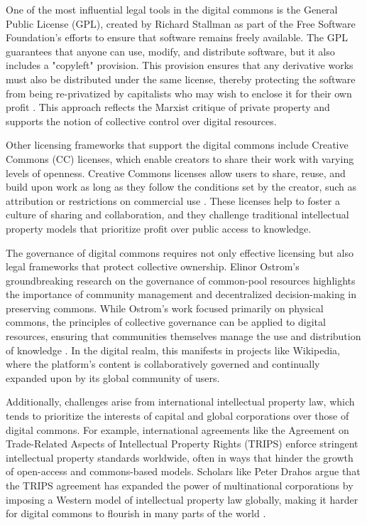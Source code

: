 \begin{refsection}
One of the most influential legal tools in the digital commons is the General Public License (GPL), created by Richard Stallman as part of the Free Software Foundation’s efforts to ensure that software remains freely available. The GPL guarantees that anyone can use, modify, and distribute software, but it also includes a "copyleft" provision. This provision ensures that any derivative works must also be distributed under the same license, thereby protecting the software from being re-privatized by capitalists who may wish to enclose it for their own profit \cite[pp.~45-47]{stallman2010}. This approach reflects the Marxist critique of private property and supports the notion of collective control over digital resources.

Other licensing frameworks that support the digital commons include Creative Commons (CC) licenses, which enable creators to share their work with varying levels of openness. Creative Commons licenses allow users to share, reuse, and build upon work as long as they follow the conditions set by the creator, such as attribution or restrictions on commercial use \cite[pp.~99-102]{lessig2019}. These licenses help to foster a culture of sharing and collaboration, and they challenge traditional intellectual property models that prioritize profit over public access to knowledge.

The governance of digital commons requires not only effective licensing but also legal frameworks that protect collective ownership. Elinor Ostrom’s groundbreaking research on the governance of common-pool resources highlights the importance of community management and decentralized decision-making in preserving commons. While Ostrom's work focused primarily on physical commons, the principles of collective governance can be applied to digital resources, ensuring that communities themselves manage the use and distribution of knowledge \cite[pp.~60-61]{ostrom1990}. In the digital realm, this manifests in projects like Wikipedia, where the platform’s content is collaboratively governed and continually expanded upon by its global community of users.

Additionally, challenges arise from international intellectual property law, which tends to prioritize the interests of capital and global corporations over those of digital commons. For example, international agreements like the Agreement on Trade-Related Aspects of Intellectual Property Rights (TRIPS) enforce stringent intellectual property standards worldwide, often in ways that hinder the growth of open-access and commons-based models. Scholars like Peter Drahos argue that the TRIPS agreement has expanded the power of multinational corporations by imposing a Western model of intellectual property law globally, making it harder for digital commons to flourish in many parts of the world \cite[pp.~176-178]{drahos2002}.


\end{refsection}

